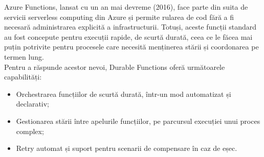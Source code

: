 Azure Functions, lansat cu un an mai devreme (2016), face parte din suita de servicii serverless computing din Azure și permite rularea de cod fără a fi necesară administrarea explicită a infrastructurii. Totuși, aceste funcții standard au fost concepute pentru execuții rapide, de scurtă durată, ceea ce le făcea mai puțin potrivite pentru procesele care necesită menținerea stării și coordonarea pe termen lung. \parencite{azureDurableFunctions}
\\Pentru a răspunde acestor nevoi, Durable Functions oferă următoarele capabilități:
\begin{itemize}
    \item Orchestrarea funcțiilor de scurtă durată, într-un mod automatizat și declarativ;
    \item Gestionarea stării între apelurile funcțiilor, pe parcursul execuției unui proces complex;
    \item Retry automat și suport pentru scenarii de compensare în caz de eșec.
\end{itemize}\parencite{azureDurableFunctions}

